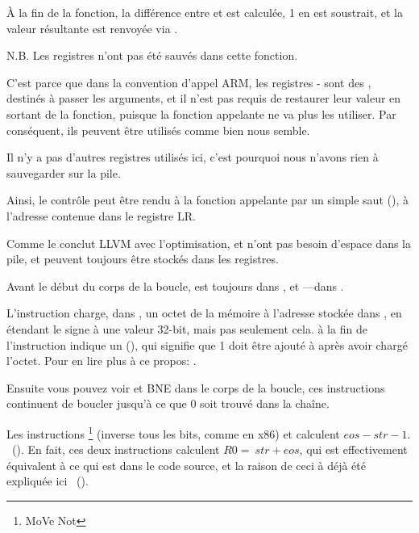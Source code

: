 À la fin de la fonction, la différence entre  et  est calculée,
1 en est soustrait, et la valeur résultante est renvoyée via .

N.B. Les registres n'ont pas été sauvés dans cette fonction.

C'est parce que dans la convention d'appel ARM, les registres - sont
des , destinés à passer les arguments, et il n'est pas requis
de restaurer leur valeur en sortant de la fonction, puisque  la fonction appelante
ne va plus les utiliser.
Par conséquent, ils peuvent être utilisés comme bien nous semble.

Il n'y a pas d'autres registres utilisés ici, c'est pourquoi nous n'avons rien à
sauvegarder sur la pile.

Ainsi, le contrôle peut être rendu à la fonction appelante par un simple saut (),
à l'adresse contenue dans le registre \ac{LR}.

\mysubparagraph{\OptimizingXcodeIV (\ThumbMode)}



Comme le conclut LLVM avec l'optimisation,  et  n'ont pas besoin
d'espace dans la pile, et peuvent toujours être stockés dans les registres.

Avant le début du corps de la boucle,  est toujours dans , et
---dans .

L'instruction  charge, dans , un octet de la mémoire
à l'adresse stockée dans , en étendant le signe à une valeur 32-bit, mais
pas seulement cela.
 à la fin de l'instruction indique un  (),
qui signifie que 1 doit être ajouté à  après avoir chargé l'octet.
Pour en lire plus à ce propos: .

Ensuite vous pouvez voir \CMP et \ac{BNE} dans le corps de la boucle, ces instructions
continuent de boucler jusqu'à ce que 0 soit trouvé dans la chaîne.

Les instructions \footnote{MoVe Not} (inverse tous les bits, comme \NOT
en x86) et \ADD calculent $eos - str - 1$.
~().
En fait, ces deux instructions calculent $R0 = ~str + eos$, qui est effectivement
équivalent à ce qui est dans le code source, et la raison de ceci à déjà été expliquée
ici ~().

